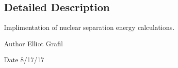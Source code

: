 \subsection{Detailed Description}
Implimentation of nuclear separation energy calculations. 

\begin{DoxyAuthor}{Author}
Elliot Grafil 
\end{DoxyAuthor}
\begin{DoxyDate}{Date}
8/17/17 
\end{DoxyDate}
